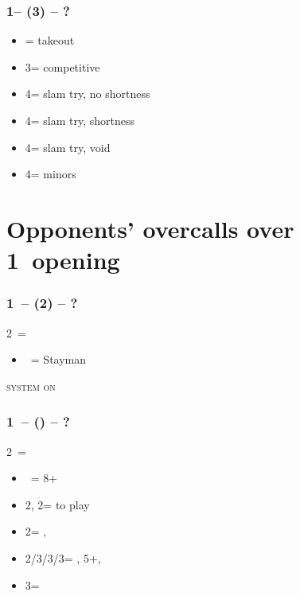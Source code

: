 \documentclass[12pt, a4paper]{report}
\begin{document}
{{{            \subsubsection*{1\spades -- (3\hearts) -- ?}
            \begin{itemize}
                \item \dbl = takeout
                \item 3\spades = competitive
                \item 4\clubs = slam try, no \diams shortness
                \item 4\diams = slam try, \diams shortness
                \item 4\hearts = slam try, \hearts void
                \item 4\nt = minors
            \end{itemize}

        }

        \section*{\colorbox{blue!30}{Opponents' overcalls over 1\ntx\ opening}}
         {

            \subsubsection*{1\ntx\ -- (2\clubs) -- ?}
            2\clubs\ = \clubs
            \begin{itemize}
                \item \dbl\ = Stayman
            \end{itemize}

            \textsc{system on}

            \subsubsection*{1\ntx\ -- (\alrts{2\clubs}) -- ?}
            2\clubs\ = \major
            \begin{itemize}
                \item \dbl\ = 8+
                \item 2\diams, 2\hearts = to play
                \item 2\spades = \minor, \invp
                \item 2\nt/3\clubs/3\diams/3\hearts = \trsf{\clubs/\diams/\hearts/\spades}, 5+, \invp
                \item 3\spades = \gf
            \end{itemize}

}}}
\end{document}
